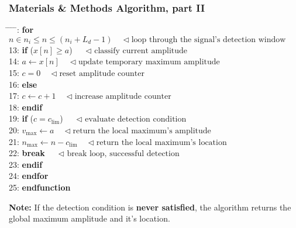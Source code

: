 \documentclass[11pt,aspectratio=169]{beamer}
\begin{document}
	\begin{frame}
		\frametitle{Materials \& Methods \textendash{} Algorithm, part II}
		\small
		\begin{tabbing}
			\hspace{0.5cm} \= \hspace{0.5cm} \= \hspace{0.5cm} \= \hspace{0.5cm} \= : \> \> \textbf{for} $n \in n_i \leq n \leq (n_i + L_d - 1) \quad \triangleleft \text{loop through the signal's detection window}$ \\
			13: \> \> \> \textbf{if} ($x[n] \geq a$) $\quad \triangleleft \text{ classify current amplitude}$ \\
			14: \> \> \> \> $a \gets x[n] \quad \triangleleft \text{update temporary maximum amplitude}$ \\
			15: \> \> \> \> $c = 0 \quad \triangleleft \text{reset amplitude counter}$ \\
			16: \> \> \> \textbf{else} \\
			17: \> \> \> \> $c \gets c + 1 \quad \triangleleft \text{increase amplitude counter}$ \\
			18: \> \> \> \textbf{endif} \\
			19: \> \> \> \textbf{if} ($c = c_{\lim}$) $\quad \triangleleft \text{ evaluate detection condition}$ \\
			20: \> \> \> \> $v_{\max} \gets a \quad \triangleleft \text{return the local maximum's amplitude}$ \\
			21: \> \> \> \> $n_{\max} \gets n - c_{\lim} \quad \triangleleft \text{return the local maximum's location}$ \\
			22: \> \> \> \> \textbf{break} $\quad \triangleleft \text{ break loop, successful detection}$ \\
			23: \> \> \> \textbf{endif} \\
			24: \> \> \textbf{endfor} \\
			25: \> \textbf{endfunction} \\
		\end{tabbing}
		\textbf{Note:} If the detection condition is \textbf{never satisfied}, the algorithm returns the global maximum amplitude and it's location.
	\end{frame}
\end{document}
